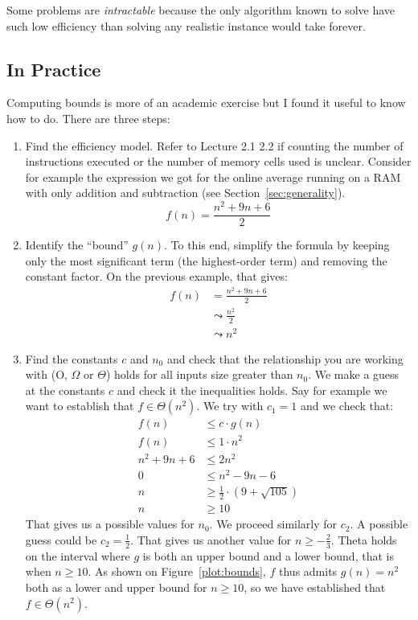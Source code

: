 \documentclass{aldast}
\begin{document}
  Some problems are \emph{intractable} because the only algorithm
  known to solve have such low efficiency than solving any realistic
  instance would take forever.


\subsection{In Practice}

Computing bounds is more of an academic exercise but I found it useful
to know how to do. There are three steps:

\begin{enumerate}
\item Find the efficiency model. Refer to Lecture 2.1 2.2 if counting
  the number of instructions executed or the number of memory cells
  used is unclear. Consider for example the expression we got for the
  online average running on a RAM with only addition and subtraction
  (see Section~\ref{sec:generality}). 
  \begin{equation}
    f(n) = \frac{n^2+9n+6}{2}
  \end{equation}
\item Identify the ``bound'' $g(n)$. To this end, simplify the formula
  by keeping only the most significant term (the highest-order term)
  and removing the constant factor. On the previous example, that
  gives:
  \begin{align*}
    f(n) & = \frac{n^2+9n+6}{2} \\
    & \leadsto \frac{n^2}{2} \tag{highest order term} \\
    & \leadsto n^2 \tag{constant factors}
  \end{align*}
\item {}
  Find the constants $c$ and $n_0$ and check that the relationship
  you are working with (O, $\Omega$ or $\Theta$) holds for all inputs
  size greater than $n_0$. We make a guess at the constants $c$ and
  check it the inequalities holds. Say for example we want to
  establish that $f \in \Theta(n^2)$. We try with $c_1 = 1$ and we
  check that:
  \begin{align*}
    f(n) & \leq c \cdot g(n) \\
    f(n) & \leq 1 \cdot n^2 \\
    n^2+9n+6 & \leq 2n^2 \\
    0 & \leq n^2 - 9n -6 \\
    n & \geq \frac{1}{2} \cdot \left(9 + \sqrt{105}\right) \\
    n & \geq 10
  \end{align*}
  That gives us a possible values for $n_0$. We proceed similarly for
  $c_2$. A possible guess could be $c_2=\frac{1}{2}$. That gives us
  another value for $n \geq -\frac{2}{3}$. Theta holds on the interval
  where $g$ is both an upper bound and a lower bound, that is when
  $n\geq 10$. As shown on Figure~\ref{plot:bounds}, $f$ thus admits
  $g(n)=n^2$ both as a lower and upper bound for $n \geq 10$, so we
  have established that $f \in \Theta(n^2)$.
\end{enumerate}
\end{document}
